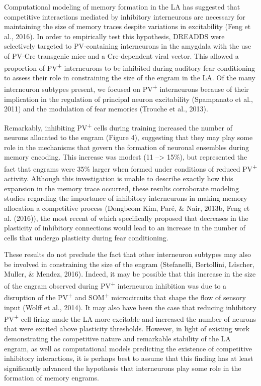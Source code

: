 \documentclass[12pt,a4paperpaper,]{report}
\begin{document}
Computational modeling of memory formation in the LA has suggested that
competitive interactions mediated by inhibitory interneurons are
necessary for maintaining the size of memory traces despite variations
in excitability (Feng et al., 2016). In order to empirically test this
hypothesis, DREADDS were selectively targeted to PV-containing
interneurons in the amygdala with the use of PV-Cre transgenic mice and
a Cre-dependent viral vector. This allowed a proportion of
PV\textsuperscript{+} interneurons to be inhibited during auditory fear
conditioning to assess their role in constraining the size of the engram
in the LA. Of the many interneuron subtypes present, we focused on
PV\textsuperscript{+} interneurons because of their implication in the
regulation of principal neuron excitability (Spampanato et al., 2011)
and the modulation of fear memories (Trouche et al., 2013).

Remarkably, inhibiting PV\textsuperscript{+} cells during training
increased the number of neurons allocated to the engram (Figure 4),
suggesting that they may play some role in the mechanisms that govern
the formation of neuronal ensembles during memory encoding. This
increase was modest (11 --\textgreater{} 15\%), but represented the fact
that engrams were 35\% larger when formed under conditions of reduced
PV\textsuperscript{+} activity. Although this investigation is unable to
describe exactly how this expansion in the memory trace occurred, these
results corroborate modeling studies regarding the importance of
inhibitory interneurons in making memory allocation a competitive
process (Dongbeom Kim, Paré, \& Nair, 2013b, Feng et al. (2016)), the
most recent of which specifically proposed that decreases in the
plasticity of inhibitory connections would lead to an increase in the
number of cells that undergo plasticity during fear conditioning.

These results do not preclude the fact that other interneuron subtypes
may also be involved in constraining the size of the engram (Stefanelli,
Bertollini, Lüscher, Muller, \& Mendez, 2016). Indeed, it may be
possible that this increase in the size of the engram observed during
PV\textsuperscript{+} interneuron inhibition was due to a disruption of
the PV\textsuperscript{+} and SOM\textsuperscript{+} microcircuits that
shape the flow of sensory input (Wolff et al., 2014). It may also have
been the case that reducing inhibitory PV\textsuperscript{+} cell firing
made the LA more excitable and increased the number of neurons that were
excited above plasticity thresholds. However, in light of existing work
demonstrating the competitive nature and remarkable stability of the LA
engram, as well as computational models predicting the existence of
competitive inhibitory interactions, it is perhaps best to assume that
this finding has at least significantly advanced the hypothesis that
interneurons play some role in the formation of memory engrams.
\end{document}
